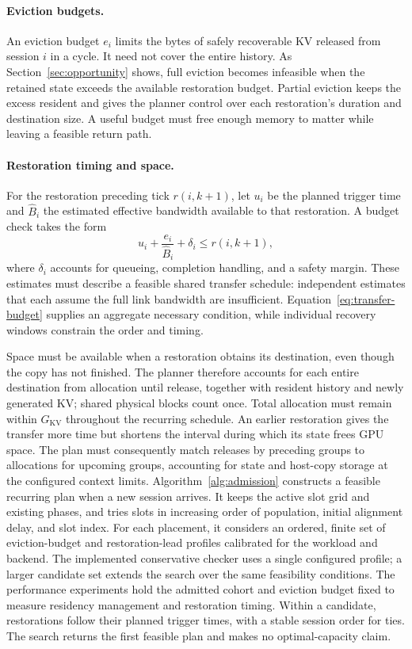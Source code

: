 \paragraph{Eviction budgets.}
An eviction budget $e_i$ limits the bytes of safely recoverable KV released from session $i$ in a cycle.
It need not cover the entire history.
As Section~\ref{sec:opportunity} shows, full eviction becomes infeasible when the retained state exceeds the available restoration budget.
Partial eviction keeps the excess resident and gives the planner control over each restoration's duration and destination size.
A useful budget must free enough memory to matter while leaving a feasible return path.

\paragraph{Restoration timing and space.}
For the restoration preceding tick $r(i,k+1)$, let $u_i$ be the planned trigger time and $\widehat B_i$ the estimated effective bandwidth available to that restoration.
A budget check takes the form
\[
  u_i+\frac{e_i}{\widehat B_i}+\delta_i\le r(i,k+1),
\]
where $\delta_i$ accounts for queueing, completion handling, and a safety margin.
These estimates must describe a feasible shared transfer schedule: independent estimates that each assume the full link bandwidth are insufficient.
Equation~\ref{eq:transfer-budget} supplies an aggregate necessary condition, while individual recovery windows constrain the order and timing.

Space must be available when a restoration obtains its destination, even though the copy has not finished.
The planner therefore accounts for each entire destination from allocation until release, together with resident history and newly generated KV; shared physical blocks count once.
Total allocation must remain within $G_{\mathrm{KV}}$ throughout the recurring schedule.
An earlier restoration gives the transfer more time but shortens the interval during which its state frees GPU space.
The plan must consequently match releases by preceding groups to allocations for upcoming groups, accounting for state and host-copy storage at the configured context limits.
Algorithm~\ref{alg:admission} constructs a feasible recurring plan when a new session arrives.
It keeps the active slot grid and existing phases, and tries slots in increasing order of population, initial alignment delay, and slot index.
For each placement, it considers an ordered, finite set of eviction-budget and restoration-lead profiles calibrated for the workload and backend.
The implemented conservative checker uses a single configured profile; a larger candidate set extends the search over the same feasibility conditions.
The performance experiments hold the admitted cohort and eviction budget fixed to measure residency management and restoration timing.
Within a candidate, restorations follow their planned trigger times, with a stable session order for ties.
The search returns the first feasible plan and makes no optimal-capacity claim.


